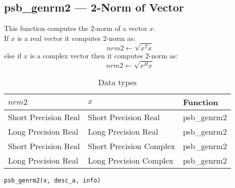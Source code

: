 %
%


\clearpage\subsection*{psb\_genrm2 --- 2-Norm of Vector}    

This function computes the 2-norm of a vector $x$.\\
If $x$ is a  real  vector
it computes 2-norm as:
\[ nrm2 \leftarrow \sqrt{x^T x}\]
else if $x$ is a complex vector then it computes 2-norm  as:
\[ nrm2 \leftarrow \sqrt{x^H x}\]

\begin{table}[h]
\begin{center}
\begin{tabular}{lll}
\hline
$nrm2$ & $x$ & {\bf Function}\\
\hline
Short Precision Real&Short Precision Real & psb\_genrm2 \\
Long Precision Real&Long Precision Real & psb\_genrm2 \\
Short Precision Real&Short Precision Complex & psb\_genrm2 \\
Long Precision Real&Long Precision Complex & psb\_genrm2 \\
\hline
\end{tabular}
\end{center}
\caption{Data types\label{tab:f90nrm2}}
\end{table}

\begin{verbatim}
psb_genrm2(x, desc_a, info)
\end{verbatim}

